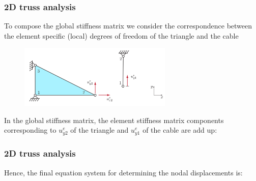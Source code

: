 \documentclass[notes]{beamer}
\begin{document}
\begin{frame}
\frametitle{2D truss analysis}
To compose the global stiffness matrix we consider the correspondence between the
element specific (local) degrees of freedom of the triangle and the cable

\begin{figure}
	\centering
	\includegraphics[width=0.65\textwidth]{figs/2d-truss-solution.png}
\end{figure}

In the global stiffness matrix, the element stiffness matrix components corresponding
to $u^e_{y2}$ of the triangle and $u^e_{y1}$ of the cable are add up:

\end{frame}

\begin{frame}
\frametitle{2D truss analysis}
Hence, the final equation system for determining the nodal displacements is:
\end{frame}
\end{document}
